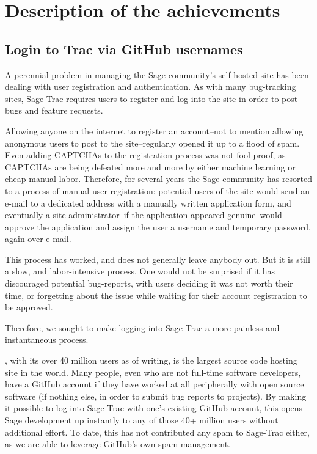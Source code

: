\hypertarget{description-of-the-achievements}{%
\section{Description of the
achievements}\label{description-of-the-achievements}}

\hypertarget{trac-github-login}{%
\subsection{Login to Trac via GitHub usernames}\label{trac-github-login}}
A perennial problem in managing the Sage community's self-hosted \Trac site has
been dealing with user registration and authentication.  As with many
bug-tracking sites, Sage-Trac requires users to register and log into the site
in order to post bugs and feature requests.

Allowing anyone on the internet to register an account--not to mention allowing
anonymous users to post to the site--regularly opened it up to a flood of spam.
Even adding CAPTCHAs to the registration process was not fool-proof, as
CAPTCHAs are being defeated more and more by either machine learning or cheap
manual labor.  Therefore, for several years the Sage community has resorted
to a process of manual user registration: potential users of the site would
send an e-mail to a dedicated address with a manually written application form,
and eventually a site administrator--if the application appeared genuine--would
approve the application and assign the user a username and temporary password,
again over e-mail.

This process has worked, and does not generally leave anybody out.  But it is
still a slow, and labor-intensive process.  One would not be surprised if it
has discouraged potential bug-reports, with users deciding it was not worth
their time, or forgetting about the issue while waiting for their account
registration to be approved.

Therefore, we sought to make logging into Sage-Trac a more painless and
instantaneous process.

\GitHub, with its over 40 million users as of writing, is the largest source
code hosting site in the world.  Many people, even who are not full-time
software developers, have a GitHub account if they have worked at all
peripherally with open source software (if nothing else, in order to submit bug
reports to projects).  By making it possible to log into Sage-Trac with one's
existing GitHub account, this opens Sage development up instantly to any of
those 40+ million users without additional effort.  To date, this has not
contributed any spam to Sage-Trac either, as we are able to leverage GitHub's
own spam management.


